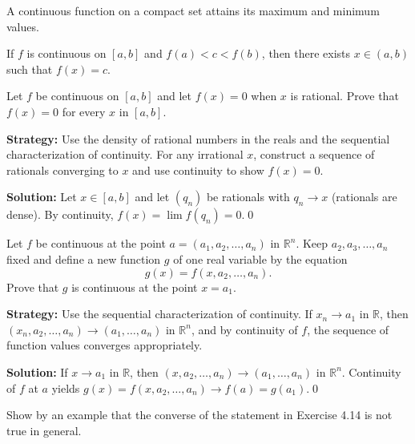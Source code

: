 \begin{theorem}
A continuous function on a compact set attains its maximum and minimum values.
\end{theorem}

\begin{theorem}
If $f$ is continuous on $[a,b]$ and $f(a) < c < f(b)$, then there exists $x \in (a,b)$ such that $f(x) = c$.
\end{theorem}



\begin{problembox}
Let \( f \) be continuous on \([a, b]\) and let \( f(x) = 0 \) when \( x \) is rational. Prove that \( f(x) = 0 \) for every \( x \) in \([a, b]\).
\end{problembox}

\noindent\textbf{Strategy:} Use the density of rational numbers in the reals and the sequential characterization of continuity. For any irrational $x$, construct a sequence of rationals converging to $x$ and use continuity to show $f(x) = 0$.

\bigskip\noindent\textbf{Solution:}
Let $x\in[a,b]$ and let $(q_n)$ be rationals with $q_n\to x$ (rationals are dense). By continuity, $f(x)=\lim f(q_n)=0$.\qed



\begin{problembox}
Let \( f \) be continuous at the point \( a = (a_1, a_2, \ldots, a_n) \) in \( \mathbb{R}^n \). Keep \( a_2, a_3, \ldots, a_n \) fixed and define a new function \( g \) of one real variable by the equation
\[g(x) = f(x, a_2, \ldots, a_n).\]
Prove that \( g \) is continuous at the point \( x = a_1 \).
\end{problembox}

\noindent\textbf{Strategy:} Use the sequential characterization of continuity. If $x_n \to a_1$ in $\mathbb{R}$, then $(x_n, a_2, \ldots, a_n) \to (a_1, \ldots, a_n)$ in $\mathbb{R}^n$, and by continuity of $f$, the sequence of function values converges appropriately.

\bigskip\noindent\textbf{Solution:}
If $x\to a_1$ in $\mathbb{R}$, then $(x,a_2,\ldots,a_n)\to(a_1,\ldots,a_n)$ in $\mathbb{R}^n$. Continuity of $f$ at $a$ yields $g(x)=f(x,a_2,\ldots,a_n)\to f(a)=g(a_1)$.\qed



\begin{problembox}
Show by an example that the converse of the statement in Exercise 4.14 is not true in general.
\end{problembox}

